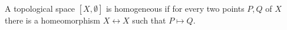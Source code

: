 A topological space $[X, \emptyset]$ is homogeneous if for every two points $P, Q$ of $X$ there is a homeomorphism $X \leftrightarrow X$ such that $P \mapsto Q$.
